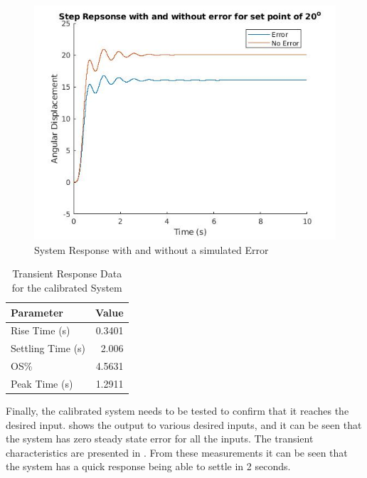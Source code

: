 \documentclass[a4paper, 11pt, compsoc]{IEEEtran}
\begin{document}
		\begin{figure}[!ht]
			\centering
			\includegraphics[width=\columnwidth]{lab4Error.jpg}
			\caption{System Response with and without a simulated Error}
			\label{fig:lab4Error}
		\end{figure}
		\begin{table}
			\centering			
			\begin{tabular}{l|r}
				Parameter         & \multicolumn{1}{l}{Value} \\ \hline
				Rise Time (s)     & 0.3401                    \\
				Settling Time (s) & 2.006                     \\
				OS\%              & 4.5631                    \\
				Peak Time (s)     & 1.2911                   
				\end{tabular}
			\caption{Transient Response Data for the calibrated System}
			\label{tab:transientResLab4}
		\end{table}
		Finally, the calibrated system needs to be tested to confirm that it reaches the desired input.  shows the output to various desired inputs, and it can be seen that the system has zero steady state error for all the inputs. The transient characteristics are presented in . From these measurements it can be seen that the system has a quick response being able to settle in 2 seconds.
		\par
\end{document}
